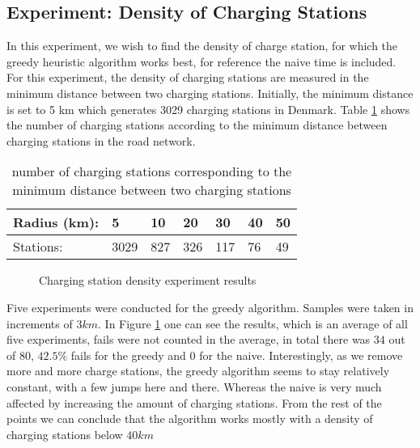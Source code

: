 \subsection{Experiment: Density of Charging Stations}
In this experiment, we wish to find the density of charge station, for which the greedy heuristic algorithm works best, for reference the naive time is included. For this experiment, the density of charging stations are measured in the minimum distance between two charging stations. Initially, the minimum distance is set to 5 km which generates 3029 charging stations in Denmark. Table \ref{table:chargedensity} shows the number of charging stations according to the minimum distance between charging stations in the road network.

\begin{table}[!htb]
\centering
		\begin{tabular}{ p{1.85cm} p{0.67cm} p{0.63cm} p{0.63cm} p{0.63cm} p{0.63cm} p{0.63cm} } \hline
		Radius (km): & 5 & 10 & 20 & 30 & 40 & 50 \\ \hline
		Stations: & 3029 & 827 & 326 & 117 & 76 & 49 \\ \hline 
		\end{tabular}
		\caption{number of charging stations corresponding to the minimum distance between two charging stations}
	\label{table:chargedensity}
	\end{table}

\begin{figure}[!htb]
\centering
{}
\caption{Charging station density experiment results} 
\label{fig:cs_density}
\end{figure}


Five experiments were conducted for the greedy algorithm. Samples were taken in increments of $3\si{km}$. In Figure \ref{fig:cs_density} one can see the results, which is an average of all five experiments, fails were not counted in the average, in total there was $34$ out of $80$, $42.5\%$ fails for the greedy and $0$ for the naive. Interestingly, as we remove more and more charge stations, the greedy algorithm seems to stay relatively constant, with a few jumps here and there. Whereas the naive is very much affected by increasing the amount of charging stations. From the rest of the points we can conclude that the algorithm works mostly with a density of charging stations below $40\si{km}$


